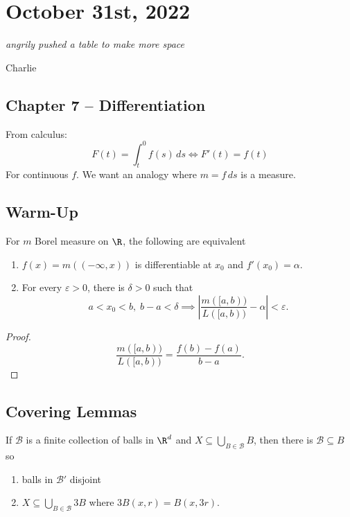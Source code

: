 \section{October 31st, 2022}

\epigraph{\textit{angrily pushed a table to make more space}}{Charlie}

\subsection{Chapter 7 -- Differentiation}

\noindent From calculus:
\[
  F(t) = \int_{t}^{0} f(s) \,ds \iff F'(t) = f(t)
\]
For continuous $f$. We want an analogy where $m = f \,ds$ is a measure.

\subsection*{Warm-Up}

\begin{theorem}
  For $m$ Borel measure on $\R$, the following are equivalent
  \begin{enumerate}
    \item $f(x) = m((-\infty, x))$ is differentiable at $x_0$ and $f'(x_0) = \alpha$.
    \item For every $\varepsilon > 0$, there is $\delta > 0$ such that
      \[
      a < x_0 < b, \; b - a < \delta \implies \left| \frac{m([a,b))}{L([a,b))} - \alpha \right| < \varepsilon.
      \]
  \end{enumerate}
\end{theorem}

\begin{proof}
  \[
    \frac{m([a,b))}{L([a,b))} = \frac{f(b) - f(a)}{b-a}.
  \]
\end{proof}

\subsection{Covering Lemmas}

\begin{lemma}
  If $\mathcal{B}$ is a finite collection of balls in $\R^d$ and $X \subseteq \bigcup_{B \in \mathcal{B}} B$, then there is $\mathcal{B} \subseteq B$ so
  \begin{enumerate}
    \item balls in $\mathcal{B}'$ disjoint \label{lma:1}
    \item $X \subseteq \bigcup_{B \in \mathcal{B}} 3B$ where $3B(x,r) = B(x, 3r)$. \label{lma:2}
  \end{enumerate}
\end{lemma}

